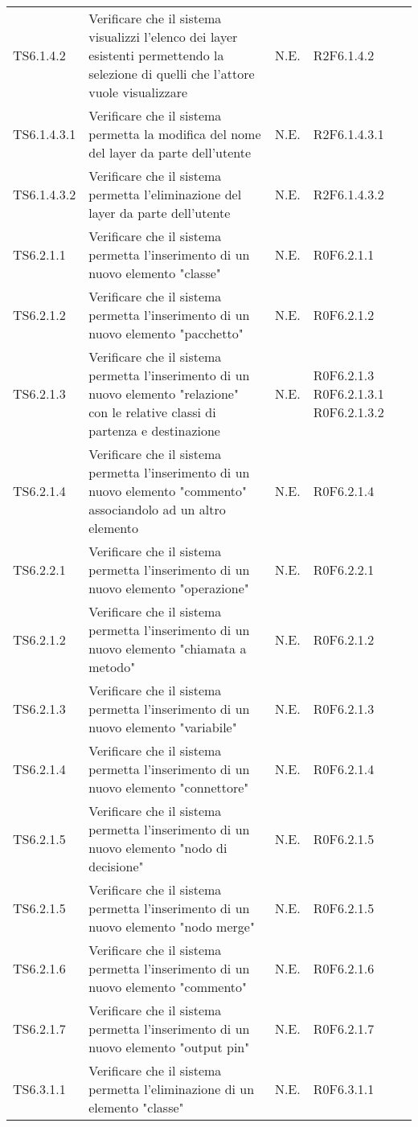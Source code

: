 \begin{longtable}{p{2.5cm}!{\VRule[1pt]}p{6.5cm}!{\VRule[1pt]}p{1cm}!{\VRule[1pt]}p{3cm}}
TS6.1.4.2 & Verificare che il sistema visualizzi l'elenco dei layer esistenti permettendo la selezione di quelli che l'attore vuole visualizzare & N.E. & R2F6.1.4.2\\
TS6.1.4.3.1 & Verificare che il sistema permetta la modifica del nome del layer da parte dell'utente & N.E. & R2F6.1.4.3.1 \\
TS6.1.4.3.2 & Verificare che il sistema permetta l'eliminazione del layer da parte dell'utente & N.E. & R2F6.1.4.3.2 \\
TS6.2.1.1 & Verificare che il sistema permetta l'inserimento di un nuovo elemento "classe" & N.E. & R0F6.2.1.1\\
TS6.2.1.2 & Verificare che il sistema permetta l'inserimento di un nuovo elemento "pacchetto" & N.E. & R0F6.2.1.2\\
TS6.2.1.3 & Verificare che il sistema permetta l'inserimento di un nuovo elemento "relazione" con le relative classi di partenza e destinazione & N.E. & R0F6.2.1.3 R0F6.2.1.3.1\newline
R0F6.2.1.3.2\\
TS6.2.1.4 & Verificare che il sistema permetta l'inserimento di un nuovo elemento "commento" associandolo ad un altro elemento & N.E. & R0F6.2.1.4\\
TS6.2.2.1 & Verificare che il sistema permetta l'inserimento di un nuovo elemento "operazione" & N.E. & R0F6.2.2.1\\
TS6.2.1.2 & Verificare che il sistema permetta l'inserimento di un nuovo elemento "chiamata a metodo" & N.E. & R0F6.2.1.2\\
TS6.2.1.3 & Verificare che il sistema permetta l'inserimento di un nuovo elemento "variabile" & N.E. & R0F6.2.1.3\\
TS6.2.1.4 & Verificare che il sistema permetta l'inserimento di un nuovo elemento "connettore" & N.E. & R0F6.2.1.4\\
TS6.2.1.5 & Verificare che il sistema permetta l'inserimento di un nuovo elemento "nodo di decisione" & N.E. & R0F6.2.1.5\\
TS6.2.1.5 & Verificare che il sistema permetta l'inserimento di un nuovo elemento "nodo merge" & N.E. & R0F6.2.1.5\\
TS6.2.1.6 & Verificare che il sistema permetta l'inserimento di un nuovo elemento "commento" & N.E. & R0F6.2.1.6\\
TS6.2.1.7 & Verificare che il sistema permetta l'inserimento di un nuovo elemento "output pin" & N.E. & R0F6.2.1.7\\
TS6.3.1.1 & Verificare che il sistema permetta l'eliminazione di un elemento "classe" & N.E. & R0F6.3.1.1\\

\end{longtable}
